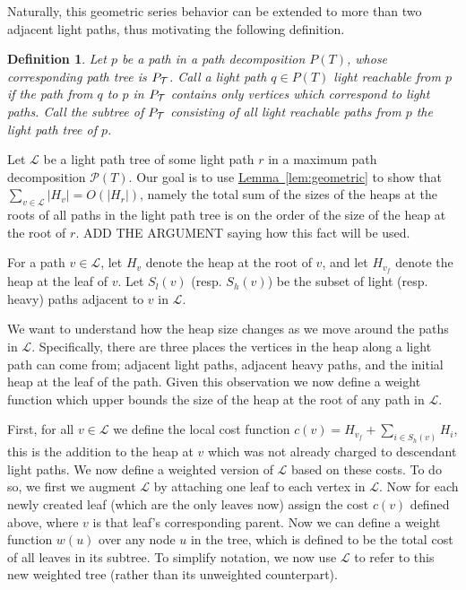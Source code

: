 \documentclass[11pt]{article}
\newtheorem{definition}[theorem]{Definition}
\theoremstyle{definition}
\newcommand{\Lem}[1]{\hyperref[lem:#1]{Lemma~\ref*{lem:#1}}} %
\begin{document}
Naturally, this geometric series behavior can be extended to more than two adjacent light paths, thus motivating 
the following definition.

\begin{definition}
 Let $p$ be a path in a path decomposition $P(T)$, whose corresponding path tree is $P_{\mathcal{T}}$.
 Call a light path $q\in P(T)$ light reachable from $p$ if the path from $q$ to $p$ in $P_{\mathcal{T}}$ 
 contains only vertices which correspond to light paths.  Call the subtree of $P_{\mathcal{T}}$ consisting 
 of all light reachable paths from $p$ the \emph{light path tree} of $p$.
\end{definition}


Let $\mathcal{L}$ be a light path tree of some light path $r$ in a maximum path decomposition $\mathcal{P}(T)$.
Our goal is to use \Lem{geometric}  to show that $\sum_{v\in \mathcal{L}} |H_v| = O(|H_r|)$, namely the total sum of the sizes of the heaps 
at the roots of all paths in the light path tree is on the order of the size of the heap at the root of $r$.  
ADD THE ARGUMENT saying how this fact will be used.

For a path $v\in \mathcal{L}$, let $H_v$ denote the heap at the root of $v$, and let $H_{v_f}$ denote the heap 
at the leaf of $v$.  Let $S_l(v)$ (resp. $S_h(v)$) be the subset of light (resp. heavy) paths adjacent to $v$ in $\mathcal{L}$.

We want to understand how the heap size changes as we move around the paths in $\mathcal{L}$.  Specifically, there are 
three places the vertices in the heap along a light path can come from; adjacent light paths, adjacent heavy paths, and the initial heap at the leaf of the path.  
Given this observation we now define a weight function which upper bounds the size of the heap at the root of any path in $\mathcal{L}$.

First, for all $v\in \mathcal{L}$ we define the local cost function $c(v) = H_{v_f}+\sum_{i\in S_h(v)} H_i$, this is the addition to the heap at $v$ which 
was not already charged to descendant light paths.  We now define a weighted version of $\mathcal{L}$ based on these costs.  
To do so, we first we augment $\mathcal{L}$ by attaching one 
leaf to each vertex in $\mathcal{L}$.  Now for each newly created leaf (which are the only leaves now) assign the cost 
$c(v)$ defined above, where $v$ is that leaf's corresponding parent.  
Now we can define a weight function $w(u)$ over any node $u$ in the tree, which is defined to be the total cost of all leaves in its subtree.   
To simplify notation, we now use $\mathcal{L}$ to refer to this new weighted tree (rather than its unweighted counterpart).
\end{document}
